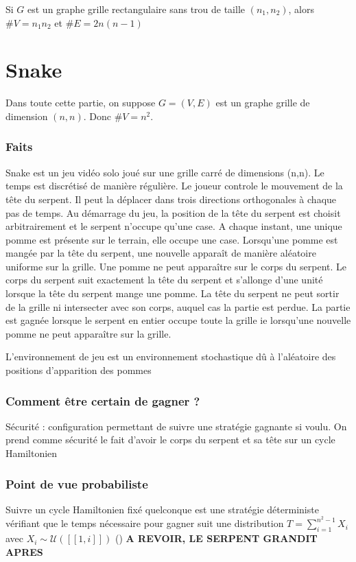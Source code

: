 \documentclass{article}
\begin{document}
Si $G$ est un graphe grille rectangulaire sans trou de taille $(n_{1},n_{2})$, alors $\#V=n_{1}n_{2}$ et $\#E=2n(n-1)$




\part{Snake}
Dans toute cette partie, on suppose $G=(V,E)$ est un graphe grille de dimension $(n,n)$. Donc $\# V=n^{2}$.

\section{Faits}
Snake est un jeu vidéo solo joué sur une grille carré de dimensions (n,n). Le temps est discrétisé de manière régulière. Le joueur controle le mouvement de la tête du serpent. Il peut la déplacer dans trois directions orthogonales à chaque pas de temps. Au démarrage du jeu, la position de la tête du serpent est choisit arbitrairement et le serpent n'occupe qu'une case. A chaque instant, une unique pomme est présente sur le terrain, elle occupe une case. Lorsqu'une pomme est mangée par la tête du serpent, une nouvelle apparaît de manière aléatoire uniforme sur la grille. Une pomme ne peut apparaître sur le corps du serpent. Le corps du serpent suit exactement la tête du serpent et s'allonge d'une unité lorsque la tête du serpent mange une pomme. La tête du serpent ne peut sortir de la grille ni intersecter avec son corps, auquel cas la partie est perdue. La partie est gagnée lorsque le serpent en entier occupe toute la grille ie lorsqu'une nouvelle pomme ne peut apparaître sur la grille.

L'environnement de jeu est un environnement stochastique dû à l'aléatoire des positions d'apparition des pommes

\section{Comment être certain de gagner ?}
Sécurité : configuration permettant de suivre une stratégie gagnante si voulu.
On prend comme sécurité le fait d'avoir le corps du serpent et sa tête sur un cycle Hamiltonien

\section{Point de vue probabiliste}
Suivre un cycle Hamiltonien fixé quelconque est une stratégie  déterministe vérifiant que le temps nécessaire pour gagner suit une distribution $T=\sum\limits_{i=1}^{n^{2}-1}X_{i}$ avec $X_{i} \sim \mathcal{U}([\![1,i]\!])$ (\cite{Du2022AlphaSnakePI}) \textbf{A REVOIR, LE SERPENT GRANDIT APRES}
\end{document}
